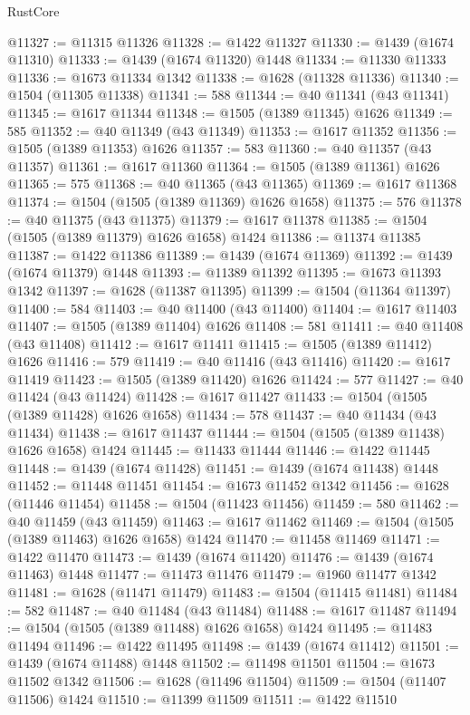 \begin{lexlean}{RustCore}
\begin{coremodule}
@11327 := @11315 @11326
@11328 := @1422 @11327
@11330 := @1439 (@1674 @11310)
@11333 := @1439 (@1674 @11320) @1448
@11334 := @11330 @11333
@11336 := @1673 @11334 @1342
@11338 := @1628 (@11328 @11336)
@11340 := @1504 (@11305 @11338)
@11341 := 588
@11344 := @40 @11341 (@43 @11341)
@11345 := @1617 @11344
@11348 := @1505 (@1389 @11345) @1626
@11349 := 585
@11352 := @40 @11349 (@43 @11349)
@11353 := @1617 @11352
@11356 := @1505 (@1389 @11353) @1626
@11357 := 583
@11360 := @40 @11357 (@43 @11357)
@11361 := @1617 @11360
@11364 := @1505 (@1389 @11361) @1626
@11365 := 575
@11368 := @40 @11365 (@43 @11365)
@11369 := @1617 @11368
@11374 := @1504 (@1505 (@1389 @11369) @1626 @1658)
@11375 := 576
@11378 := @40 @11375 (@43 @11375)
@11379 := @1617 @11378
@11385 := @1504 (@1505 (@1389 @11379) @1626 @1658) @1424
@11386 := @11374 @11385
@11387 := @1422 @11386
@11389 := @1439 (@1674 @11369)
@11392 := @1439 (@1674 @11379) @1448
@11393 := @11389 @11392
@11395 := @1673 @11393 @1342
@11397 := @1628 (@11387 @11395)
@11399 := @1504 (@11364 @11397)
@11400 := 584
@11403 := @40 @11400 (@43 @11400)
@11404 := @1617 @11403
@11407 := @1505 (@1389 @11404) @1626
@11408 := 581
@11411 := @40 @11408 (@43 @11408)
@11412 := @1617 @11411
@11415 := @1505 (@1389 @11412) @1626
@11416 := 579
@11419 := @40 @11416 (@43 @11416)
@11420 := @1617 @11419
@11423 := @1505 (@1389 @11420) @1626
@11424 := 577
@11427 := @40 @11424 (@43 @11424)
@11428 := @1617 @11427
@11433 := @1504 (@1505 (@1389 @11428) @1626 @1658)
@11434 := 578
@11437 := @40 @11434 (@43 @11434)
@11438 := @1617 @11437
@11444 := @1504 (@1505 (@1389 @11438) @1626 @1658) @1424
@11445 := @11433 @11444
@11446 := @1422 @11445
@11448 := @1439 (@1674 @11428)
@11451 := @1439 (@1674 @11438) @1448
@11452 := @11448 @11451
@11454 := @1673 @11452 @1342
@11456 := @1628 (@11446 @11454)
@11458 := @1504 (@11423 @11456)
@11459 := 580
@11462 := @40 @11459 (@43 @11459)
@11463 := @1617 @11462
@11469 := @1504 (@1505 (@1389 @11463) @1626 @1658) @1424
@11470 := @11458 @11469
@11471 := @1422 @11470
@11473 := @1439 (@1674 @11420)
@11476 := @1439 (@1674 @11463) @1448
@11477 := @11473 @11476
@11479 := @1960 @11477 @1342
@11481 := @1628 (@11471 @11479)
@11483 := @1504 (@11415 @11481)
@11484 := 582
@11487 := @40 @11484 (@43 @11484)
@11488 := @1617 @11487
@11494 := @1504 (@1505 (@1389 @11488) @1626 @1658) @1424
@11495 := @11483 @11494
@11496 := @1422 @11495
@11498 := @1439 (@1674 @11412)
@11501 := @1439 (@1674 @11488) @1448
@11502 := @11498 @11501
@11504 := @1673 @11502 @1342
@11506 := @1628 (@11496 @11504)
@11509 := @1504 (@11407 @11506) @1424
@11510 := @11399 @11509
@11511 := @1422 @11510

\end{coremodule}
\end{lexlean}

